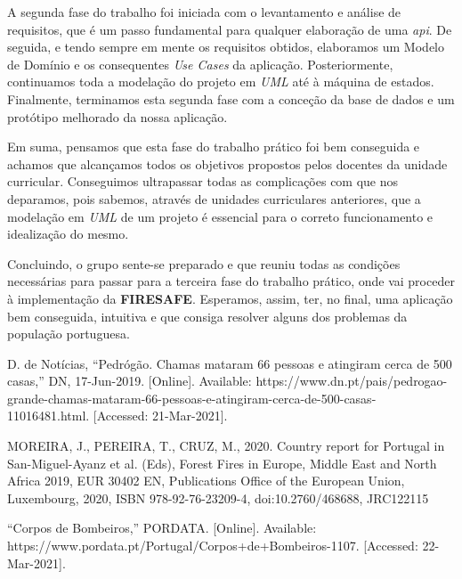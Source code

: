 \documentclass[a4paper,12pt]{scrreprt}
\newcommand{\tab}{
    \hspace{1cm}}
\begin{document}
\vspace{0.5cm}
\tab A segunda fase do trabalho foi iniciada com o levantamento e análise de requisitos, que é um passo fundamental para qualquer elaboração de uma \textit{api}. De seguida, e tendo sempre em mente os requisitos obtidos, elaboramos um Modelo de Domínio e os consequentes \textit{Use Cases} da aplicação. Posteriormente, continuamos toda a modelação do projeto em \textit{UML} até à máquina de estados. Finalmente, terminamos esta segunda fase com a conceção da base de dados e um protótipo melhorado da nossa aplicação.

\tab Em suma, pensamos que esta fase do trabalho prático foi bem conseguida e achamos que alcançamos todos os objetivos propostos pelos docentes da unidade curricular. Conseguimos ultrapassar todas as complicações com que nos deparamos, pois sabemos, através de unidades curriculares anteriores, que a modelação em \textit{UML} de um projeto é essencial para o correto funcionamento e idealização do mesmo. 

\tab Concluindo, o grupo sente-se preparado e que reuniu todas as condições necessárias para passar para a terceira fase do trabalho prático, onde vai proceder à implementação da \textbf{FIRESAFE}. Esperamos, assim, ter, no final, uma aplicação bem conseguida, intuitiva e que consiga resolver alguns dos problemas da população portuguesa.



\renewcommand\bibname{Referências}

\begin{thebibliography}{9}

D. de Notícias, “Pedrógão. Chamas mataram 66 pessoas e atingiram cerca de 500 casas,” DN, 17-Jun-2019. [Online]. Available: https://www.dn.pt/pais/pedrogao-grande-chamas-mataram-66-pessoas-e-atingiram-cerca-de-500-casas-11016481.html. [Accessed: 21-Mar-2021]. 

MOREIRA, J., PEREIRA, T., CRUZ, M., 2020. Country report for Portugal in San-Miguel-Ayanz et al. (Eds), Forest Fires in Europe, Middle East and North Africa 2019, EUR 30402 EN, Publications Office of the European Union, Luxembourg, 2020, ISBN 978-92-76-23209-4, doi:10.2760/468688, JRC122115

“Corpos de Bombeiros,” PORDATA. [Online]. Available: https://www.pordata.pt/Portugal/Corpos+de+Bombeiros-1107. [Accessed: 22-Mar-2021]. 

\end{thebibliography}
\end{document}

